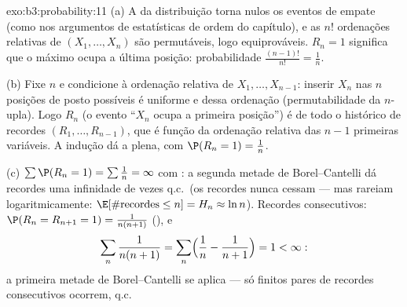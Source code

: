 \begin{solution}{exo:b3:probability:11}
(a) A  da distribuição torna nulos os eventos de empate
(como nos argumentos de estatísticas de ordem do capítulo), e as
$n!$ ordenações relativas de $(X_1, \dots, X_n)$ são
permutáveis, logo equiprováveis. $R_n = 1$ significa que o
máximo ocupa a última posição: probabilidade
$\frac{(n-1)!}{n!} = \frac1n$.

(b) Fixe $n$ e condicione à ordenação relativa de $X_1,
\dots, X_{n-1}$: inserir $X_n$ nas $n$ posições de posto
possíveis é uniforme e  dessa ordenação
(permutabilidade da $n$-upla). Logo $R_n$ (o evento
``$X_n$ ocupa a primeira posição'') é  de todo o
histórico de recordes $(R_1, \dots, R_{n-1})$, que é função
da ordenação relativa das $n - 1$ primeiras variáveis.
A indução dá a  plena, com $\P(R_n = 1) =
\frac1n$.

(c) $\sum\P(R_n = 1) = \sum\frac1n = \infty$ com
: a segunda metade de Borel--Cantelli dá recordes
uma infinidade de vezes q.c.\ (os recordes nunca cessam --- mas
rareiam logaritmicamente: $\E[\#\text{recordes} \leq n] =
H_n \approx \ln n$). Recordes consecutivos: $\P(R_n = R_{n+1}
= 1) = \frac1{n(n+1)}$ (), e
\[
\sum_n\frac1{n(n+1)} = \sum_n\Bigl(\frac1n -
\frac1{n+1}\Bigr) = 1 < \infty :
\]
a primeira metade de Borel--Cantelli se aplica --- só finitos
pares de recordes consecutivos ocorrem, q.c.
\end{solution}

